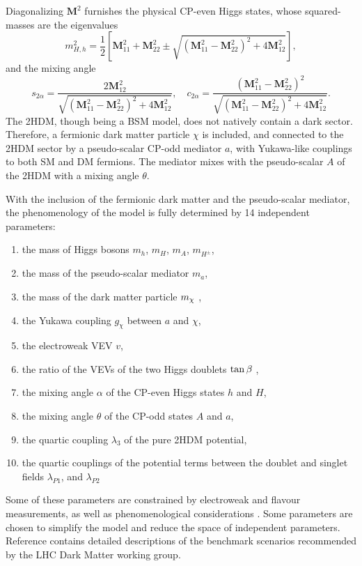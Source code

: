 Diagonalizing $\mathbf{M}^2$ furnishes the physical CP-even Higgs states, whose squared-masses are the eigenvalues
\begin{equation}
    \label{4.7}
    m^2_{H,h} = \frac{1}{2}\left[ \mathbf{M}^2_{11} + \mathbf{M}^2_{22} \pm \sqrt{(\mathbf{M}^2_{11} - \mathbf{M}^2_{22})^2 + 4\mathbf{M}^2_{12}} \right],
\end{equation}
and the mixing angle 
\begin{equation}
    \label{4.8}
    s_{2\alpha} = \frac{2\mathbf{M}^2_{12}}{\sqrt{(\mathbf{M}^2_{11} - \mathbf{M}^2_{22})^2 + 4\mathbf{M}^2_{12}}} , \quad c_{2\alpha} = \frac{(\mathbf{M}^2_{11} - \mathbf{M}^2_{22})^2}{\sqrt{(\mathbf{M}^2_{11} - \mathbf{M}^2_{22})^2 + 4\mathbf{M}^2_{12}}}.
\end{equation}
The 2HDM, though being a BSM model, does not natively contain a dark sector. Therefore, a fermionic dark matter particle $\chi$ is included, and connected to the 2HDM sector by a pseudo-scalar CP-odd mediator $a$, with Yukawa-like couplings to both SM and DM fermions. The mediator mixes with the pseudo-scalar $A$ of the 2HDM with a mixing angle $\theta$. 

With the inclusion of the fermionic dark matter and the pseudo-scalar mediator, the phenomenology of the model is fully determined by 14 independent parameters:
\begin{enumerate}
    \item the mass of Higgs bosons $m_h$, $m_H$, $m_A$, $m_{H^{\pm}}$,
    \item the mass of the pseudo-scalar mediator $m_a$,
    \item the mass of the dark matter particle $m_{\chi}~$,
    \item the Yukawa coupling $g_{\chi}$ between $a$ and $\chi$,
    \item the electroweak VEV $v$,
    \item the ratio of the VEVs of the two Higgs doublets $\tan\beta~$,
    \item the mixing angle $\alpha$ of the CP-even Higgs states $h$ and $H$,
    \item the mixing angle $\theta$ of the CP-odd states $A$ and $a$,
    \item the quartic coupling $\lambda_3$ of the pure 2HDM potential,
    \item the quartic couplings of the potential terms between the doublet and singlet fields $\lambda_{P1}$, and $\lambda_{P2}$
\end{enumerate}
Some of these parameters are constrained by electroweak and flavour measurements, as well as phenomenological considerations \cite{Bauer:2017ota,2HDMWGproxi}. Some parameters are chosen to simplify the model and reduce the space of independent parameters. Reference \cite{2HDMWGproxi} contains detailed descriptions of the \thdma benchmark scenarios recommended by the LHC Dark Matter working group. 


